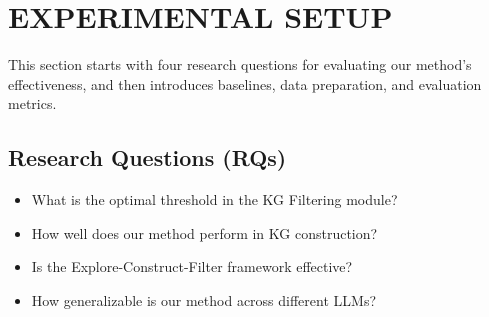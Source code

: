 \section{EXPERIMENTAL SETUP}
This section starts with four research questions for evaluating our method's effectiveness, and then introduces baselines, data preparation, and evaluation metrics.

\subsection{Research Questions (RQs)}
\begin{itemize}[leftmargin=*]
\item What is the optimal threshold in the KG Filtering module?
\item How well does our method perform in KG construction?
\item Is the Explore-Construct-Filter framework effective?
\item How generalizable is our method across different LLMs?
\end{itemize}

